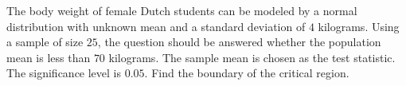 The body weight of female Dutch students can be modeled by a normal distribution with unknown mean and a standard deviation of $4$ kilograms. 
Using a sample of size $25$, the question should be answered whether the population mean is less than $70$ kilograms. 
The sample mean is chosen as the test statistic. 
The significance level is $0.05$. 
Find the boundary of the critical region.